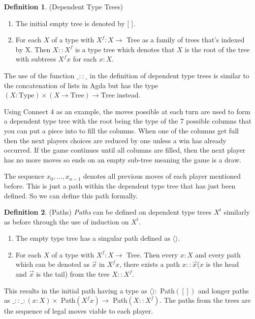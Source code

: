 \documentclass[12pt]{article}
\theoremstyle{definition}
\newtheorem{definition}{Definition}[section]
\begin{document}
\begin{definition}(Dependent Type Trees)

\begin{enumerate}
\item The initial empty tree is denoted by [ ].
\item For each $X$ of a type with $X^f : X \rightarrow$ Tree as a family of trees that's indexed by X. Then $X :: X^f$ is a type tree which denotes that $X$ is the root of the tree with subtrees $X^fx$ for each $x : X$.
\end{enumerate}
The use of the function $\_::\_$ in the definition of dependent type trees is similar to the concatenation of lists in Agda but has the type $(X : \text{Type}) \times (X \rightarrow \text{Tree}) \rightarrow \text{Tree}$ instead.
\end{definition}

Using Connect 4 as an example, the moves possible at each turn are used to form a dependent type tree with the root being the type of the 7 possible columns that you can put a piece into to fill the columns. When one of the columns get full then the next players choices are reduced by one unless a win has already occurred. If the game continues until all columns are filled, then the next player has no more moves so ends on an empty sub-tree meaning the game is a draw. 

The sequence $x_0,...,x_{n-1}$ denotes all previous moves of each player mentioned before. This is just a path within the dependent type tree that has just been defined. So we can define this path formally.

\begin{definition}(Paths) 
\emph{Paths} can be defined on dependent type trees $X^t$ similarly as before through the use of induction on $X^t$.
\begin{enumerate}
\item The empty type tree has a singular path defined as $\langle \rangle$.
\item For each $X$ of a type with $X^f : X \rightarrow$ Tree. Then every $x : X$ and every path which can be denoted as $\overrightarrow{x}$ in $X^fx$, there exists a path $x::\overrightarrow{x}$($x$ is the head and $\overrightarrow{x}$ is the tail) from the tree $X::X^f$.
\end{enumerate}
This results in the initial path having a type as $\langle \rangle :$ Path$([])$ and longer paths as $\_::\_ : (x : X) \times$ Path$(X^fx) \rightarrow$ Path$(X :: X^f)$. The paths from the trees are the sequence of legal moves viable to each player.
\end{definition}
\end{document}
